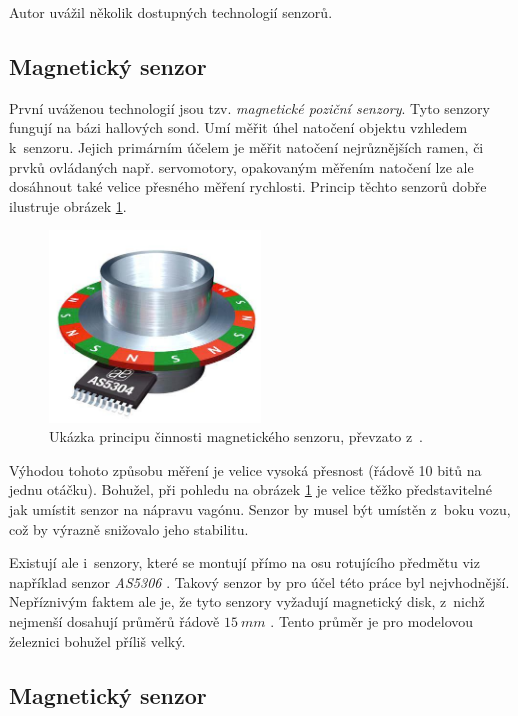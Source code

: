 Autor uvážil několik dostupných technologií senzorů.

\subsection{Magnetický senzor}
\label{subsec:wsm-senzor-mag}

První uváženou technologií jsou tzv. \textit{magnetické poziční senzory}.
Tyto senzory fungují na bázi hallových sond. Umí měřit úhel natočení objektu
vzhledem k~senzoru. Jejich primárním účelem je měřit natočení nejrůznějších
ramen, či prvků ovládaných např. servomotory, opakovaným měřením natočení lze
ale dosáhnout také velice přesného měření rychlosti. Princip těchto senzorů
dobře ilustruje obrázek \ref{fig:magnetic-sensor}.

\begin{figure}[h]
\includegraphics[width=0.5\textwidth]{data/magnetic_sensor.png}
\caption{Ukázka principu činnosti magnetického senzoru, převzato
z~\cite{as5306}.}
\label{fig:magnetic-sensor}
\end{figure}

Výhodou tohoto způsobu měření je velice vysoká přesnost (řádově 10 bitů na
jednu otáčku). Bohužel, při pohledu na obrázek \ref{fig:magnetic-sensor} je
velice těžko představitelné jak umístit senzor na nápravu vagónu. Senzor by
musel být umístěn z~boku vozu, což by výrazně snižovalo jeho stabilitu.

Existují ale i~senzory, které se montují přímo na osu rotujícího předmětu viz
například senzor \textit{AS5306} \cite{as5306}. Takový senzor by pro účel této
práce byl nejvhodnější. Nepříznivým faktem ale je, že tyto senzory vyžadují
magnetický disk, z~nichž nejmenší dosahují průměrů řádově $15\ mm$
\cite{magnets}. Tento průměr je pro modelovou železnici bohužel příliš velký.

\subsection{Magnetický senzor }
\label{subsec:wsm-senzor-cyclo}

